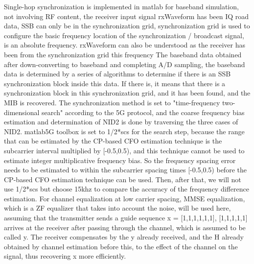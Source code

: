 \documentclass[english]{cccconf}
\begin{document}
Single-hop synchronization is implemented in matlab for baseband simulation, not involving RF content, the receiver input signal rxWaveform has been IQ road data, SSB can only be in the synchronization grid, synchronization grid is used to configure the basic frequency location of the synchronization / broadcast signal, is an absolute frequency. rxWaveform can also be understood as the receiver has been from the synchronization grid this frequency The baseband data obtained after down-converting to baseband and completing A/D sampling, the baseband data is determined by a series of algorithms to determine if there is an SSB synchronization block inside this data. If there is, it means that there is a synchronization block in this synchronization grid, and it has been found, and the MIB is recovered. The synchronization method is set to "time-frequency two-dimensional search" according to the 5G protocol, and the coarse frequency bias estimation and determination of NID2 is done by traversing the three cases of NID2. matlab5G toolbox is set to 1/2*scs for the search step, because the range that can be estimated by the CP-based CFO estimation technique is the subcarrier interval multiplied by [-0.5,0.5), and this technique cannot be used to estimate integer multiplicative frequency bias. So the frequency spacing error needs to be estimated to within the subcarrier spacing times [-0.5,0.5) before the CP-based CFO estimation technique can be used.
Then, after that, we will not use 1/2*scs but choose 15khz to compare the accuracy of the frequency difference estimation.
For channel equalization at low carrier spacing, MMSE equalization, which is a ZF equalizer that takes into account the noise, will be used here, assuming that the transmitter sends a guide sequence x = [1,1,1,1,1,1], [1,1,1,1,1] arrives at the receiver after passing through the channel, which is assumed to be called y. The receiver compensates by the y already received, and the H already obtained by channel estimation before this, to the effect of the channel on the signal, thus recovering x more efficiently.
\end{document}
